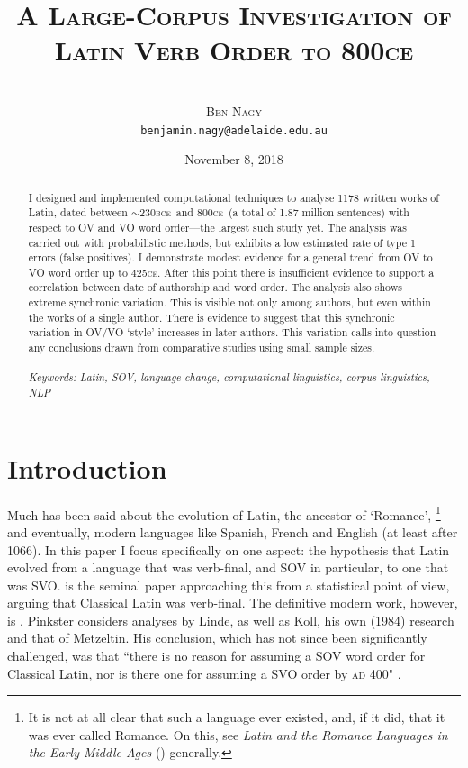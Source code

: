 \documentclass[11pt,a4paper]{scrartcl} %
\newcommand{\bce}{\textsc{bce}\ }
\newcommand{\ce}{\textsc{ce}\ }
\begin{document}
\title{\rmfamily\normalfont\textsc{A Large-Corpus Investigation of Latin Verb Order to 800ce}}
\author{\phantom{xxx}\\\textsc{Ben Nagy}\\\small{\texttt{benjamin.nagy@adelaide.edu.au}}}
\date{\normalsize{November 8, 2018}}

\maketitle

\begin{abstract}
\noindent I designed and implemented computational techniques to analyse 1178 written works of Latin, dated between $\sim$230\bce and 800\ce (a total of 1.87 million sentences) with respect to OV and VO word order---the largest such study yet. The analysis was carried out with probabilistic methods, but exhibits a low estimated rate of type 1 errors (false positives). I demonstrate modest evidence for a general trend from OV to VO word order up to 425\textsc{ce}. After this point there is insufficient evidence to support a correlation between date of authorship and word order. The analysis also shows extreme synchronic variation. This is visible not only among authors, but even within the works of a single author. There is evidence to suggest that this synchronic variation in OV/VO `style' increases in later authors. This variation calls into question any conclusions drawn from comparative studies using small sample sizes.\\
\phantom{xxx}\\
\noindent\textit{Keywords: Latin, SOV, language change, computational linguistics, corpus linguistics, NLP}
\end{abstract}


\section{Introduction}

Much has been said about the evolution of Latin, the ancestor of `Romance',
\footnote{It is not at all clear that such a language ever existed, and, if it did, that it was ever called Romance. On this, see \textit{Latin and the Romance Languages in the Early Middle Ages} (\cite{wright}) generally.}
and eventually, modern languages like Spanish, French and English (at least after 1066). In this paper I focus specifically on one aspect: the hypothesis that Latin evolved from a language that was verb-final, and SOV in particular, to one that was SVO. \cite{linde} is the seminal paper approaching this from a statistical point of view, arguing that Classical Latin was verb-final. The definitive modern work, however, is \cite{pinkster}. Pinkster considers analyses by Linde, as well as Koll, his own (1984) research and that of Metzeltin. His conclusion, which has not since been significantly challenged, was that ``there is no reason for assuming a SOV word order for Classical Latin, nor is there one for assuming a SVO order by \textsc{ad} 400" \cite[80]{pinkster}.
\end{document}
